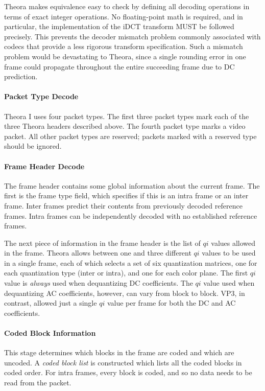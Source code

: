 \documentclass[11pt,letterpaper]{article}
\newcommand{\qi}{\ensuremath{\mathit{qi}} }
\newcommand{\term}[1]{{\em #1}}
\begin{document}
Theora makes equivalence easy to check by defining all decoding operations in
 terms of exact integer operations.
No floating-point math is required, and in particular, the implementation of
 the iDCT transform MUST be followed precisely.
This prevents the decoder mismatch problem commonly associated with codecs that
 provide a less rigorous transform specification.
Such a mismatch problem would be devastating to Theora, since a single rounding
 error in one frame could propagate throughout the entire succeeding frame due
 to DC prediction.

\paragraph{Packet Type Decode}

Theora I uses four packet types.
The first three packet types mark each of the three Theora headers described
 above.
The fourth packet type marks a video packet.
All other packet types are reserved; packets marked with a reserved type should
 be ignored.

\paragraph{Frame Header Decode}

The frame header contains some global information about the current frame.
The first is the frame type field, which specifies if this is an intra frame or
 an inter frame.
Inter frames predict their contents from previously decoded reference frames.
Intra frames can be independently decoded with no established reference frames.

The next piece of information in the frame header is the list of \qi values
 allowed in the frame.
Theora allows between one and three different \qi values to be used in a single
 frame, each of which selects a set of six quantization matrices, one for each
 quantization type (inter or intra), and one for each color plane.
The first \qi value is {\em always} used when dequantizing DC coefficients.
The \qi value used when dequantizing AC coefficients, however, can vary from
 block to block.
VP3, in contrast, allowed just a single \qi value per frame for both the DC and
 AC coefficients.

\paragraph{Coded Block Information}

This stage determines which blocks in the frame are coded and which are
 uncoded.
A \term{coded block list} is constructed which lists all the coded blocks in
 coded order.
For intra frames, every block is coded, and so no data needs to be read from
 the packet.
\end{document}
